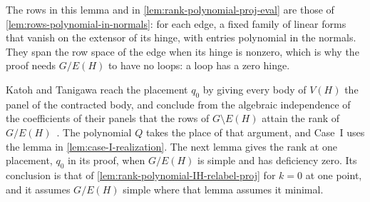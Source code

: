 \begin{fmlnote}
  The rows in this lemma and in \cref{lem:rank-polynomial-proj-eval} are
  those of \cref{lem:rows-polynomial-in-normals}: for each edge, a fixed
  family of linear forms that vanish on the extensor of its hinge, with
  entries polynomial in the normals. They span the row space of the edge
  when its hinge is nonzero, which is why the proof needs $G/E(H)$ to
  have no loops: a loop has a zero hinge.
\end{fmlnote}

Katoh and Tanigawa reach the placement $q_0$ by giving every body of
$V(H)$ the panel of the contracted body, and conclude from the algebraic
independence of the coefficients of their panels that the rows of
$G \setminus E(H)$ attain the rank of $G/E(H)$~\cite[Claim~6.4,
p.~675]{katohTanigawa2011}. The polynomial $Q$ takes the place of that
argument, and Case~I uses the lemma in \cref{lem:case-I-realization}.
The next lemma gives the rank at one placement, $q_0$ in its proof, when
$G/E(H)$ is simple and has deficiency zero. Its conclusion is that of
\cref{lem:rank-polynomial-IH-relabel-proj} for $k = 0$ at one point, and
it assumes $G/E(H)$ simple where that lemma assumes it minimal.

